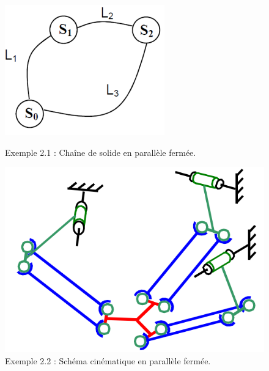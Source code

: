 \documentclass[12pt]{article}
\begin{document}


\begin{figure}
\begin{minipage}{.55\linewidth}

\centering
\includegraphics[width=0.7\linewidth]{par2.PNG}
\caption{Exemple 2.1 : Chaîne de solide en parallèle fermée.}
\label{Par2}

\end{minipage}
\begin{minipage}{.44\linewidth}

\centering
\includegraphics[width=0.8\linewidth]{par3.PNG}
\caption{Exemple 2.2 : Schéma cinématique en parallèle fermée.}
\label{Par3}

\end{minipage}
\end{figure}

\end{document}
